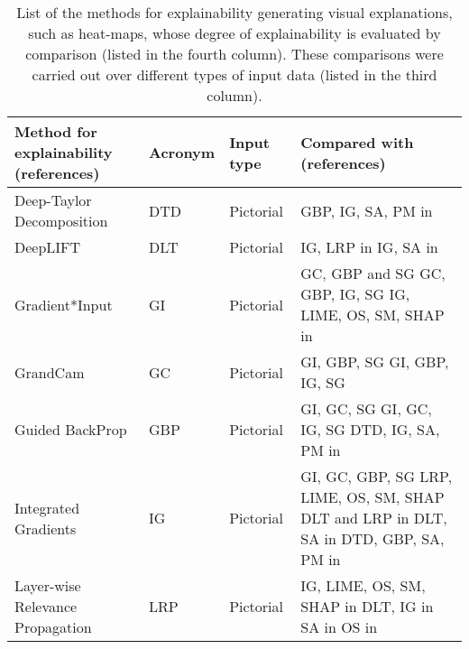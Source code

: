 \documentclass[final,1p,times]{elsarticle}
\begin{document}
\begin{table}[htbp]
\small
  \caption{List of the methods for explainability generating visual explanations, such as heat-maps, whose degree of explainability is evaluated by comparison (listed in the fourth column). These comparisons were carried out over different types of input data (listed in the third column).}
  \label{tab:visual-comparison}
  \begin{tabular}{m{4.9cm} m{1cm} m{1.5cm} m{4.4cm}}
    \hline
    Method for explainability (references) & Acronym & Input type & Compared with (references)\\
    \hline
    \hline
    Deep-Taylor Decomposition \cite{montavon2017explaining} & DTD & Pictorial & GBP, IG, SA, PM in \cite{kindermans2017reliability}\\
    \hline
    DeepLIFT \cite{shrikumar2017learning} & DLT & Pictorial & IG, LRP in \cite{ancona2018towards}\newline IG, SA in \cite{ghorbani2017interpretation}\\
    \hline
    Gradient*Input \cite{shrikumar2017learning} & GI & Pictorial & GC, GBP and SG \cite{adebayo2018local} \newline GC, GBP, IG, SG \cite{adebayo2018sanity} \newline IG, LIME, OS, SM, SHAP in \cite{alvarez2018robustness}\\
    \hline
    GrandCam \cite{selvaraju2017grad} & GC & Pictorial & GI, GBP, SG \cite{adebayo2018local} \newline GI, GBP, IG, SG \cite{adebayo2018sanity}\\
    \hline
    Guided BackProp \cite{goyal2016towards} & GBP & Pictorial & GI, GC, SG \cite{adebayo2018local} \newline GI, GC, IG, SG \cite{adebayo2018sanity} \newline DTD, IG, SA, PM in \cite{kindermans2017reliability} \\
    \hline
    Integrated Gradients \cite{sundararajan2017axiomatic} & IG & Pictorial & GI, GC, GBP, SG \cite{adebayo2018sanity} \newline LRP, LIME, OS, SM, SHAP \cite{alvarez2018robustness} \newline DLT and LRP in \cite{ancona2018towards} \newline DLT, SA in \cite{ghorbani2017interpretation} \newline DTD, GBP, SA, PM in \cite{kindermans2017reliability} \\
    \hline
    Layer-wise Relevance Propagation \cite{bach2015pixel} & LRP & Pictorial & IG, LIME, OS, SM, SHAP in  \cite{alvarez2018robustness} \newline DLT, IG in \cite{ancona2018towards} \newline SA in \cite{binder2016analyzing, samek2017evaluating, samek2017explainable} \newline OS in \cite{binder2016analyzing}\\

\end{tabular}
\end{table}
\end{document}
